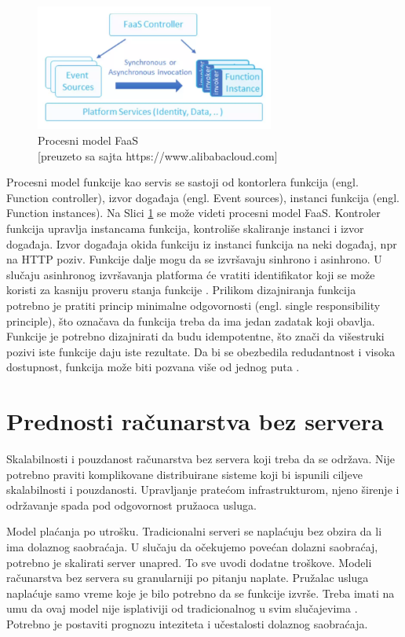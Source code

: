 \documentclass[12pt,oneside]{memoir}
\begin{document}
\begin{figure}[!ht]
  \centering
  \includegraphics[width=0.7\textwidth]{Slika 7.png}
  \caption{Procesni model FaaS\\\footnotesize[preuzeto sa sajta https://www.alibabacloud.com]}
  \label{fig:faasProcesniModel}
\end{figure}


Procesni model funkcije kao servis se sastoji od kontorlera funkcija (engl. Function controller), izvor događaja (engl. Event sources), instanci funkcija (engl. Function instances). Na Slici \ref{fig:faasProcesniModel} se može videti procesni model FaaS. Kontroler funkcija upravlja instancama funkcija, kontroliše skaliranje instanci i izvor događaja. Izvor događaja okida funkciju iz instanci funkcija na neki događaj, npr na HTTP poziv. Funkcije dalje mogu da se izvršavaju sinhrono i asinhrono. U slučaju asinhronog izvršavanja platforma će vratiti identifikator koji se može koristi za kasniju proveru stanja funkcije \cite{sah}. Prilikom dizajniranja funkcija potrebno je pratiti princip minimalne odgovornosti (engl. single responsibility principle), što označava da funkcija treba da ima jedan zadatak koji obavlja. Funkcije je potrebno dizajnirati da budu idempotentne, što znači da višestruki pozivi iste funkcije daju iste rezultate. Da bi se obezbedila redudantnost i visoka dostupnost, funkcija može biti pozvana više od jednog puta \cite{sah}.

\section{Prednosti računarstva bez servera}

Skalabilnosti i pouzdanost računarstva bez servera koji treba da se održava. Nije potrebno praviti komplikovane distribuirane sisteme koji bi ispunili ciljeve skalabilnosti i pouzdanosti. Upravljanje pratećom infrastrukturom, njeno širenje i održavanje spada pod odgovornost pružaoca usluga.

Model plaćanja po utrošku. Tradicionalni serveri se naplaćuju bez obzira da li ima dolaznog saobraćaja. U slučaju da očekujemo povećan dolazni saobraćaj, potrebno je skalirati server unapred. To sve uvodi dodatne troškove. Modeli računarstva bez servera su granularniji po pitanju naplate. Pružalac usluga naplaćuje samo vreme koje je bilo potrebno da se funkcije izvrše. Treba imati na umu da ovaj model nije isplativiji od tradicionalnog u svim slučajevima \cite{sa}. Potrebno je postaviti prognozu inteziteta i učestalosti dolaznog saobraćaja.
\end{document}
